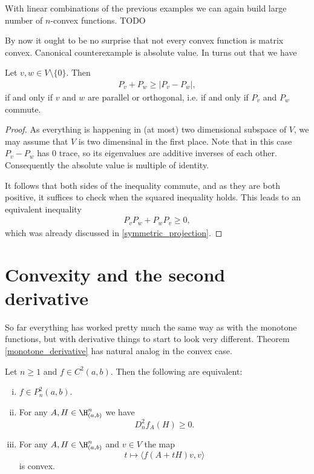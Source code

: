With linear combinations of the previous examples we can again build large number of $n$-convex functions. TODO

By now it ought to be no surprise that not every convex function is matrix convex. Canonical counterexample is absolute value. In turns out that we have

\begin{prop}
	Let $v, w \in V \setminus \{0\}$. Then
	\begin{align*}
	P_{v} + P_{w} \geq |P_{v} - P_{w}|,
	\end{align*}
	if and only if $v$ and $w$ are parallel or orthogonal, i.e. if and only if $P_{v}$ and $P_{w}$ commute.
\end{prop}
\begin{proof}
	As everything is happening in (at most) two dimensional subspace of $V$, we may assume that $V$ is two dimensinal in the first place. Note that in this case $P_{v} - P_{w}$ has $0$ trace, so its eigenvalues are additive inverses of each other. Consequently the absolute value is multiple of identity.

	It follows that both sides of the inequality commute, and as they are both positive, it suffices to check when the squared inequality holds. This leads to an equivalent inequality
	\begin{align*}
		P_{v} P_{w} + P_{w} P_{v} \geq 0,
	\end{align*}
	which was already discussed in \ref{symmetric_projection}.
\end{proof}

\section{Convexity and the second derivative}

So far everything has worked pretty much the same way as with the monotone functions, but with derivative things to start to look very different. Theorem \ref{monotone_derivative} has natural analog in the convex case.

\begin{lause}
	Let $n \geq 1$ and $f \in C^{2}(a, b)$.
	Then the following are equivalent:
	\begin{enumerate}[(i)]
	\item $f \in P^{2}_{n}(a, b)$.
	\item For any $A, H \in \H^{n}_{(a, b)}$ we have
	\[
		D^{2}_{n}f_{A}(H) \geq 0.
	\]
	\item For any $A, H \in \H^{n}_{(a, b)}$ and $v \in V$ the map
	\[
		t \mapsto \langle f(A + t H) v, v \rangle
	\]
	is convex.
	\end{enumerate}
\end{lause}

